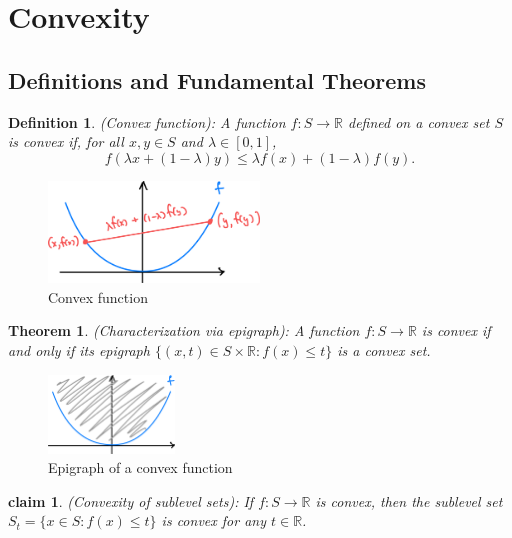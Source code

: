 \documentclass[11pt]{book} %
\newtheorem{theorem}{Theorem}[section]
\newtheorem{definition}{Definition}[section]
\newtheorem{claim}{claim}[section]
\begin{document}
\section{Convexity}

\subsection{Definitions and Fundamental Theorems}



\begin{definition} (Convex function): A function $f : S \rightarrow \mathbb{R}$ defined on a convex set $S$ is convex if, for all $x, y \in S$ and $\lambda \in [0,1]$, 
\[ f(\lambda x + (1-\lambda)y) \leq \lambda f(x) + (1-\lambda) f(y). \]
\end{definition}

\begin{figure}[H]
    \centering
    \includegraphics[width=0.5\textwidth]{Figs/convex_function.png}
    \caption{Convex function}
\end{figure}

\begin{theorem} (Characterization via epigraph): A function $f : S \to \mathbb{R}$ is convex if and only if its epigraph $\{(x,t) \in S \times \mathbb{R} : f(x) \leq t\}$ is a convex set.
\end{theorem}

\begin{figure}[H]
    \centering
    \includegraphics[width=0.3\textwidth]{Figs/epigraph_of_convex_function.png}
    \caption{Epigraph of a convex function}
\end{figure}


\begin{claim} (Convexity of sublevel sets): If $f : S \to \mathbb{R}$ is convex, then the sublevel set $S_t = \{ x \in S : f(x) \leq t\}$ is convex for any $t \in \mathbb{R}$.
\end{claim}
\end{document}
